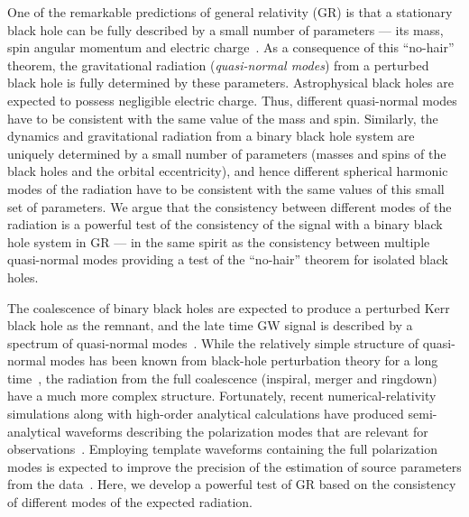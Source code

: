\documentclass[prl,preprintnumbers,twocolumn,eqsecnum,floatfix,a4paper,nofootinbib,superscriptaddress]{revtex4}
\begin{document}
One of the remarkable predictions of general relativity (GR) is that a stationary black hole can be fully described by a small number of parameters --- its mass, spin angular momentum and electric charge~\cite{uniqueness-theorems}. As a consequence of this ``no-hair'' theorem, the gravitational radiation (\emph{quasi-normal modes}) from a perturbed black hole is fully determined by these parameters. Astrophysical black holes are expected to possess negligible electric charge. Thus, different quasi-normal modes have to be consistent with the same value of the mass and spin. Similarly, the dynamics and gravitational radiation from a binary black hole system are uniquely determined by a small number of parameters (masses and spins of the black holes and the orbital eccentricity), and hence different spherical harmonic modes of the radiation have to be consistent with the same values of this small set of parameters. We argue that the consistency between different modes of the radiation is a powerful test of the consistency of the signal with a binary black hole system in GR --- in the same spirit as the consistency between multiple quasi-normal modes providing a test of the ``no-hair'' theorem for isolated black holes.  

The coalescence of binary black holes are expected to produce a perturbed Kerr black hole as the remnant, and the late time GW signal is described by a spectrum of quasi-normal modes~\cite{xxx}. While the relatively simple structure of quasi-normal modes has been known from black-hole perturbation theory for a long time~\cite{bhp-review}, the radiation from the full coalescence (inspiral, merger and ringdown) have a much more complex structure. Fortunately, recent numerical-relativity simulations along with high-order analytical calculations have produced semi-analytical waveforms describing the polarization modes that are relevant for observations~\cite{eobnr,phenom,refs,Mehta:2017jpq}. Employing template waveforms containing the full polarization modes is expected to improve the precision of the estimation of source parameters from the data~\cite{xx}. Here, we develop a powerful test of GR based on the consistency of different modes of the expected radiation.  

\end{document}
